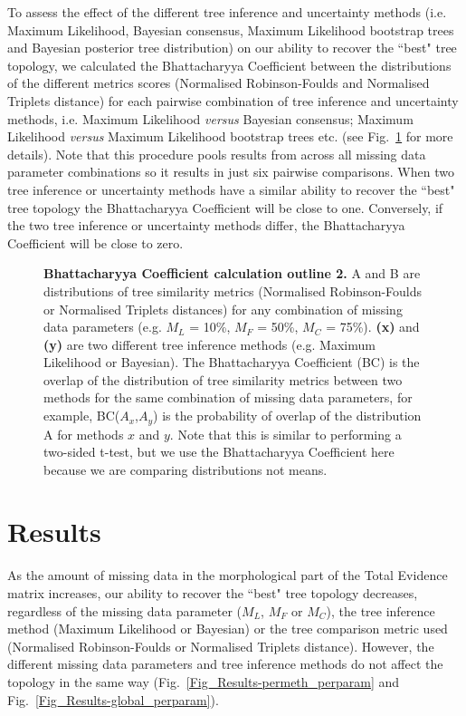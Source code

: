 \documentclass[10pt,letterpaper]{article}
\begin{document}
To assess the effect of the different tree inference and uncertainty methods (i.e. Maximum Likelihood, Bayesian consensus, Maximum Likelihood bootstrap trees and Bayesian posterior tree distribution) on our ability to recover the ``best" tree topology, we calculated the Bhattacharyya Coefficient between the distributions of the different metrics scores (Normalised Robinson-Foulds and Normalised Triplets distance) for each pairwise combination of tree inference and uncertainty methods, i.e. Maximum Likelihood \textit{versus} Bayesian consensus; Maximum Likelihood \textit{versus} Maximum Likelihood bootstrap trees etc. (see Fig.~\ref{Fig_Bhattacharyya_Coefficients2} for more details). Note that this procedure pools results from across all missing data parameter combinations so it results in just six pairwise comparisons. When two tree inference or uncertainty methods have a similar ability to recover the ``best" tree topology the Bhattacharyya Coefficient will be close to one. Conversely, if the two tree inference or uncertainty methods differ, the Bhattacharyya Coefficient will be close to zero.

\begin{figure}[h]
\caption{{\bf Bhattacharyya Coefficient calculation outline 2.}
 A and B are distributions of tree similarity metrics (Normalised Robinson-Foulds or Normalised Triplets distances) for any combination of missing data parameters (e.g. $M_{L}$ = 10\%, $M_{F}$ = 50\%, $M_{C}$ = 75\%). \textbf{(x)} and \textbf{(y)} are two different tree inference methods (e.g. Maximum Likelihood or Bayesian). The Bhattacharyya Coefficient (BC) is the overlap of the distribution of tree similarity metrics between two methods for the same combination of missing data parameters, for example, BC($A_{x}$,$A_{y}$) is the probability of overlap of the distribution A for methods $x$ and $y$. Note that this is similar to performing a two-sided t-test, but we use the Bhattacharyya Coefficient here because we are comparing distributions not means.}
\label{Fig_Bhattacharyya_Coefficients2} 
\end{figure}

%
%

\section*{Results}
As the amount of missing data in the morphological part of the Total Evidence matrix increases, our ability to recover the ``best" tree topology decreases, regardless of the missing data parameter ($M_{L}$, $M_{F}$ or $M_{C}$), the tree inference method (Maximum Likelihood or Bayesian) or the tree comparison metric used (Normalised Robinson-Foulds or Normalised Triplets distance). However, the different missing data parameters and tree inference methods do not affect the topology in the same way (Fig.~\ref{Fig_Results-permeth_perparam} and Fig.~\ref{Fig_Results-global_perparam}).
\end{document}
